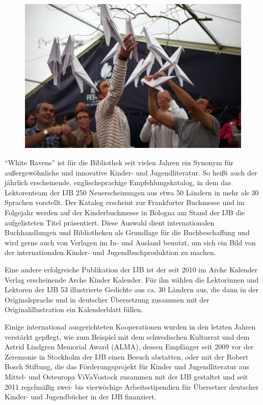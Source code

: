 \documentclass[a4paper,
fontsize=11pt,
oneside,
numbers=noperiodatend,
parskip=half-,
bibliography=totoc,
final
]{scrartcl}
\begin{document}
\begin{figure}[htbp]
\centering
\includegraphics{img/bild21.jpg}
\end{figure}

\enquote{White Ravens} ist für die Bibliothek seit vielen Jahren ein
Synonym für außergewöhnliche und innovative Kinder- und Jugendliteratur.
So heißt auch der jährlich erscheinende, englischsprachige
Empfehlungskatalog, in dem das Lektorenteam der IJB 250 Neuerscheinungen
aus etwa 50 Ländern in mehr als 30 Sprachen vorstellt. Der Katalog
erscheint zur Frankfurter Buchmesse und im Folgejahr werden auf der
Kinderbuchmesse in Bologna am Stand der IJB die aufgelisteten Titel
präsentiert. Diese Auswahl dient internationalen Buchhandlungen und
Bibliotheken als Grundlage für die Buchbeschaffung und wird gerne auch
von Verlagen im In- und Ausland benutzt, um sich ein Bild von der
internationalen Kinder- und Jugendbuchproduktion zu machen.

Eine andere erfolgreiche Publikation der IJB ist der seit 2010 im Arche
Kalender Verlag erscheinende Arche Kinder Kalender. Für ihn wählen die
Lektorinnen und Lektoren der IJB 53 illustrierte Gedichte aus ca. 30
Ländern aus, die dann in der Originalsprache und in deutscher
Übersetzung zusammen mit der Originalillustration ein Kalenderblatt
füllen.

Einige international ausgerichteten Kooperationen wurden in den letzten
Jahren verstärkt gepflegt, wie zum Beispiel mit dem schwedischen
Kulturrat und dem Astrid Lindgren Memorial Award (ALMA), dessen
Empfänger seit 2009 vor der Zeremonie in Stockholm der IJB einen Besuch
abstatten, oder mit der Robert Bosch Stiftung, die das Förderungsprojekt
für Kinder und Jugendliteratur aus Mittel- und Osteuropa ViVaVostock
zusammen mit der IJB gestaltet und seit 2011 regelmäßig zwei- bis
vierwöchige Arbeitsstipendien für Übersetzer deutscher Kinder- und
Jugendbücher in der IJB finanziert.
\end{document}
